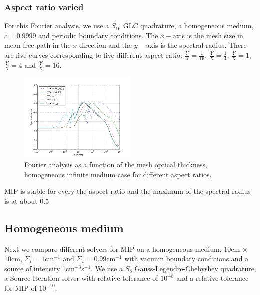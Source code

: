 \subsubsection{Aspect ratio varied}
For this Fourier analysis, we use a $S_{16}$ GLC quadrature, a homogeneous
medium, $c=0.9999$ and periodic boundary conditions. The $x-$axis is the mesh
size in mean free path in the $x$ direction and the $y-$axis is the spectral
radius. There are five curves corresponding to five different aspect ratio:
$\frac{Y}{X}=\frac{1}{16}$, $\frac{Y}{X}=\frac{1}{4}$, $\frac{Y}{X}=1$,
$\frac{Y}{X}=4$ and $\frac{Y}{X}=16$. 
\begin{figure}[H]
\centering
\includegraphics[width=0.5\textwidth]{aspect_ratio_9999}
\caption{Fourier analysis as a function of the mesh optical thickness,
homogeneous infinite medium case for different aspect ratios.}
\end{figure}
MIP is stable for every the aspect ratio and the maximum of the spectral radius
is at about 0.5

\subsection{Homogeneous medium}
Next we compare different solvers for MIP on a homogeneous medium, 10cm $\times$
10cm, $\Sigma_t=1$cm$^{-1}$ and $\Sigma_s=0.99$cm$^{-1}$ with vacuum boundary 
conditions and a source of intensity 1cm$^{-3}$s$^{-1}$. We use a $S_8$
Gauss-Legendre-Chebyshev quadrature, a Source Iteration solver with relative
tolerance of $10^{-8}$ and a relative tolerance for MIP of $10^{-10}$.
